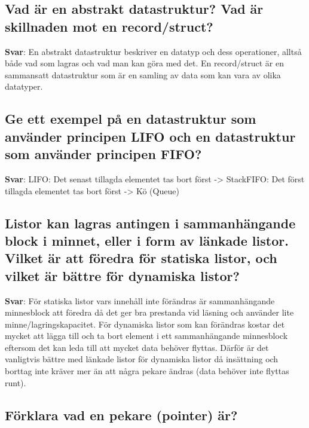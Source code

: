 \documentclass[a4paper,11pt,oneside]{article}
\begin{document}
\begin{sloppypar}
\subsection{Vad \"ar en abstrakt datastruktur? Vad \"ar skillnaden mot en record/struct?}

\label{q:260:sa:sv:True}

\textbf{Svar}: En abstrakt datastruktur beskriver en datatyp och dess operationer, allts\r{a} b\r{a}de vad som lagras och vad man kan g\"ora med det. En record/struct \"ar en sammansatt datastruktur som \"ar en samling av data som kan vara av olika datatyper.



\subsection{Ge ett exempel p\r{a} en datastruktur som anv\"ander principen LIFO och en datastruktur som anv\"ander principen FIFO?}

\label{q:261:sa:sv:True}

\textbf{Svar}: LIFO: Det senast tillagda elementet tas bort f\"orst -> StackFIFO: Det f\"orst tillagda elementet tas bort f\"orst -> K\"o (Queue)



\subsection{Listor kan lagras antingen i sammanh\"angande block i minnet, eller i form av l\"ankade listor. Vilket \"ar att f\"oredra f\"or statiska listor, och vilket \"ar b\"attre f\"or dynamiska listor?}

\label{q:262:sa:sv:True}

\textbf{Svar}: F\"or statiska listor vars inneh\r{a}ll inte f\"or\"andras \"ar sammanh\"angande minnesblock att f\"oredra d\r{a} det ger bra prestanda vid l\"asning och anv\"ander lite minne/lagringskapacitet. F\"or dynamiska listor som kan f\"or\"andras kostar det mycket att l\"agga till och ta bort element i ett sammanh\"angande minnesblock eftersom det kan leda till att mycket data beh\"over flyttas. D\"arf\"or \"ar det vanligtvis b\"attre med l\"ankade listor f\"or dynamiska listor d\r{a} ins\"attning och borttag inte kr\"aver mer \"an att n\r{a}gra pekare \"andras (data beh\"over inte flyttas runt).



\subsection{F\"orklara vad en pekare (pointer) \"ar?}


\end{sloppypar}
\end{document}
